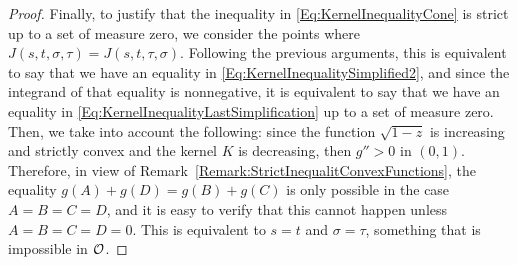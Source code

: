 \begin{proof}
Finally, to justify that the inequality in \eqref{Eq:KernelInequalityCone} is strict up to a set of
measure zero, we consider the points where $J(s,t,\sigma, \tau) = J(s,t,\tau,\sigma)$. Following
the previous arguments, this is equivalent to say that we have an equality in
\eqref{Eq:KernelInequalitySimplified2}, and since the integrand of that equality is nonnegative, it
is equivalent to say that we have an equality in \eqref{Eq:KernelInequalityLastSimplification} up
to a set of measure zero. Then, we take into account the following: since the function $\sqrt{1-z}$
is increasing and strictly convex and the kernel $K$ is decreasing, then $g''>0$ in $(0,1)$.
Therefore, in view of Remark~\eqref{Remark:StrictInequalitConvexFunctions}, the equality $g(A) +
g(D) = g(B) + g(C)$ is only possible in the case $A=B=C=D$, and it is easy to verify that this
cannot happen unless $A=B=C=D=0$. This is equivalent to $s=t$ and $\sigma=\tau$,
something that is impossible in $\mathcal{O}$.

\end{proof}

